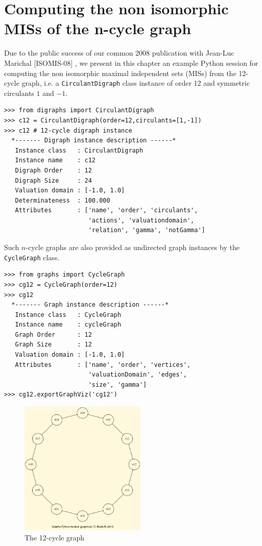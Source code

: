 \chapter{Computing the non isomorphic MISs of the n-cycle graph}
\label{sec:24}

\abstract*{}

\abstract{}

Due to the public success of our common 2008 publication with Jean-Luc Marichal [ISOMIS-08] , we present in this chapter an example Python session for computing the non isomorphic maximal independent sets (MISs) from the 12-cycle graph, i.e. a \texttt{CirculantDigraph} class instance of order 12 and symmetric circulants $1$ and $-1$.
\begin{lstlisting}
>>> from digraphs import CirculantDigraph
>>> c12 = CirculantDigraph(order=12,circulants=[1,-1])
>>> c12 # 12-cycle digraph instance
  *------- Digraph instance description ------*
   Instance class   : CirculantDigraph
   Instance name    : c12
   Digraph Order    : 12
   Digraph Size     : 24
   Valuation domain : [-1.0, 1.0]
   Determinateness  : 100.000
   Attributes       : ['name', 'order', 'circulants',
                       'actions', 'valuationdomain',
                       'relation', 'gamma', 'notGamma']
\end{lstlisting}

Such $n$-cycle graphs are also provided as undirected graph instances by the \texttt{CycleGraph} class.
\begin{lstlisting}
>>> from graphs import CycleGraph
>>> cg12 = CycleGraph(order=12)
>>> cg12
  *------- Graph instance description ------*
   Instance class   : CycleGraph
   Instance name    : cycleGraph
   Graph Order      : 12
   Graph Size       : 12
   Valuation domain : [-1.0, 1.0]
   Attributes       : ['name', 'order', 'vertices',
                       'valuationDomain', 'edges',
                       'size', 'gamma']
>>> cg12.exportGraphViz('cg12')
\end{lstlisting}
\begin{figure}[h]
\sidecaption
\includegraphics[width=6cm]{Figures/cg12.png}
\caption{The 12-cycle graph} 
\label{fig:24.1}       %
\end{figure}

